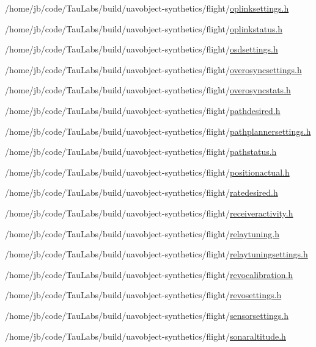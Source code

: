 \begin{DoxyCompactItemize}
/home/jb/code/\-Tau\-Labs/build/uavobject-\/synthetics/flight/\hyperlink{oplinksettings_8h}{oplinksettings.\-h}\item 
/home/jb/code/\-Tau\-Labs/build/uavobject-\/synthetics/flight/\hyperlink{oplinkstatus_8h}{oplinkstatus.\-h}\item 
/home/jb/code/\-Tau\-Labs/build/uavobject-\/synthetics/flight/\hyperlink{osdsettings_8h}{osdsettings.\-h}\item 
/home/jb/code/\-Tau\-Labs/build/uavobject-\/synthetics/flight/\hyperlink{overosyncsettings_8h}{overosyncsettings.\-h}\item 
/home/jb/code/\-Tau\-Labs/build/uavobject-\/synthetics/flight/\hyperlink{overosyncstats_8h}{overosyncstats.\-h}\item 
/home/jb/code/\-Tau\-Labs/build/uavobject-\/synthetics/flight/\hyperlink{pathdesired_8h}{pathdesired.\-h}\item 
/home/jb/code/\-Tau\-Labs/build/uavobject-\/synthetics/flight/\hyperlink{pathplannersettings_8h}{pathplannersettings.\-h}\item 
/home/jb/code/\-Tau\-Labs/build/uavobject-\/synthetics/flight/\hyperlink{pathstatus_8h}{pathstatus.\-h}\item 
/home/jb/code/\-Tau\-Labs/build/uavobject-\/synthetics/flight/\hyperlink{positionactual_8h}{positionactual.\-h}\item 
/home/jb/code/\-Tau\-Labs/build/uavobject-\/synthetics/flight/\hyperlink{ratedesired_8h}{ratedesired.\-h}\item 
/home/jb/code/\-Tau\-Labs/build/uavobject-\/synthetics/flight/\hyperlink{receiveractivity_8h}{receiveractivity.\-h}\item 
/home/jb/code/\-Tau\-Labs/build/uavobject-\/synthetics/flight/\hyperlink{relaytuning_8h}{relaytuning.\-h}\item 
/home/jb/code/\-Tau\-Labs/build/uavobject-\/synthetics/flight/\hyperlink{relaytuningsettings_8h}{relaytuningsettings.\-h}\item 
/home/jb/code/\-Tau\-Labs/build/uavobject-\/synthetics/flight/\hyperlink{revocalibration_8h}{revocalibration.\-h}\item 
/home/jb/code/\-Tau\-Labs/build/uavobject-\/synthetics/flight/\hyperlink{revosettings_8h}{revosettings.\-h}\item 
/home/jb/code/\-Tau\-Labs/build/uavobject-\/synthetics/flight/\hyperlink{sensorsettings_8h}{sensorsettings.\-h}\item 
/home/jb/code/\-Tau\-Labs/build/uavobject-\/synthetics/flight/\hyperlink{sonaraltitude_8h}{sonaraltitude.\-h}\item 

\end{DoxyCompactItemize}
